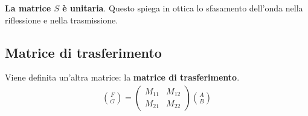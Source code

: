 \textbf{La matrice $S$ è unitaria}. Questo spiega in ottica lo sfasamento dell'onda nella riflessione e nella trasmissione.

\subsection{Matrice di trasferimento} %
Viene definita un'altra matrice: la \textbf{matrice di trasferimento}.
\begin{equation}\begin{split}
{F\choose G} =\left(\begin{matrix} {M_{11}} & {M_{12}}\\{M_{21}} & {M_{22}}\end{matrix}\right){{A}\choose{B}}
\end{split}\end{equation}